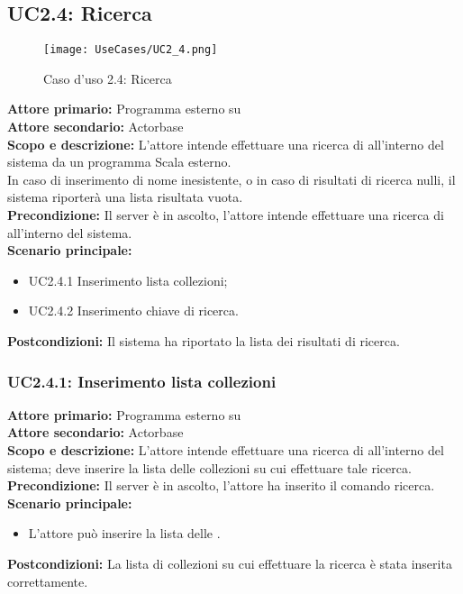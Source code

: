 \documentclass{scalatekids-article}
\begin{document}
\subsection{UC2.4: Ricerca}

\begin{figure}[H]
  \begin{center}
    \texttt{[image: UseCases/UC2\_4.png]}
    \caption{Caso d'uso 2.4: Ricerca }
  \end{center}
\end{figure}
\textbf{Attore primario:} Programma esterno su \\
\textbf{Attore secondario:} Actorbase\\
\textbf{Scopo e descrizione:} L'attore intende effettuare una ricerca di  all'interno del sistema da un programma Scala esterno.\\
In caso di inserimento di nome  inesistente, o in caso di risultati di ricerca nulli, il sistema riporterà una lista risultata vuota.\\ %
\textbf{Precondizione:} Il server è in ascolto, l'attore intende effettuare una ricerca di  all'interno del sistema.\\
\textbf{Scenario principale:}
\begin{itemize}
\item UC2.4.1 Inserimento lista collezioni;
\item UC2.4.2 Inserimento chiave di ricerca.
\end{itemize}
\textbf{Postcondizioni:} Il sistema ha riportato la lista dei risultati di ricerca.

\subsubsection{UC2.4.1: Inserimento lista collezioni}

\textbf{Attore primario:} Programma esterno su \\
\textbf{Attore secondario:} Actorbase\\
\textbf{Scopo e descrizione:} L'attore intende effettuare una ricerca di  all'interno del sistema; deve inserire la lista delle collezioni su cui effettuare tale ricerca.\\
\textbf{Precondizione:} Il server è in ascolto, l'attore ha inserito il comando ricerca.\\
\textbf{Scenario principale:}
\begin{itemize}
\item L'attore può inserire la lista delle .
\end{itemize}
\textbf{Postcondizioni:} La lista di collezioni su cui effettuare la ricerca è stata inserita correttamente.
\end{document}

